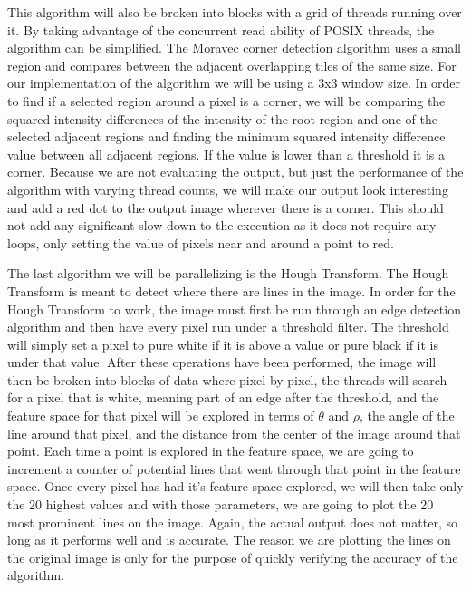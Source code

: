 \documentclass{article}
\begin{document}
        This algorithm will also be broken into blocks with a grid of threads running over it.  By taking advantage of the concurrent read ability of POSIX threads, the algorithm can be simplified.  The Moravec corner detection algorithm uses a small region and compares between the adjacent overlapping tiles of the same size.  For our implementation of the algorithm we will be using a 3x3 window size.  In order to find if a selected region around a pixel is a corner, we will be comparing the squared intensity differences of the intensity of the root region and one of the selected adjacent regions and finding the minimum squared intensity difference value between all adjacent regions.  If the value is lower than a threshold it is a corner.  Because we are not evaluating the output, but just the performance of the algorithm with varying thread counts, we will make our output look interesting and add a red dot to the output image wherever there is a corner.  This should not add any significant slow-down to the execution as it does not require any loops, only setting the value of pixels near and around a point to red.
        
        The last algorithm we will be parallelizing is the Hough Transform.  The Hough Transform is meant to detect where there are lines in the image.  In order for the Hough Transform to work, the image must first be run through an edge detection algorithm and then have every pixel run under a threshold filter.  The threshold will simply set a pixel to pure white if it is above a value or pure black if it is under that value.  After these operations have been performed, the image will then be broken into blocks of data where pixel by pixel, the threads will search for a pixel that is white, meaning part of an edge after the threshold, and the feature space for that pixel will be explored in terms of $\theta$ and $\rho$, the angle of the line around that pixel, and the distance from the center of the image around that point.  Each time a point is explored in the feature space, we are going to increment a counter of potential lines that went through that point in the feature space.  Once every pixel has had it's feature space explored, we will then take only the 20 highest values and with those parameters, we are going to plot the 20 most prominent lines on the image.  Again, the actual output does not matter, so long as it performs well and is accurate.  The reason we are plotting the lines on the original image is only for the purpose of quickly verifying the accuracy of the algorithm.
        
\end{document}
